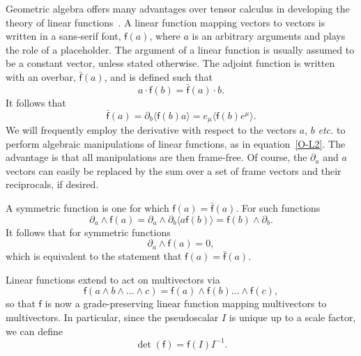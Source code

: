 \documentclass[a4paper]{article}
\numberwithin{equation}{section}
\newcommand{\dt}{\! \cdot \!}
\newcommand{\wdg}{\! \wedge \!}
\newcommand{\la}{\langle}
\newcommand{\ra}{\rangle}
\newcommand{\eqv}{=}
\newcommand{\da}{\partial_a}
\newcommand{\db}{\partial_b}
\newcommand{\lif}{\mathsf{f}}
\newcommand{\lbf}{\bar{\mathsf{f}}}
\newcommand{\fo}{\lbf}
\newcommand{\fu}{\lif}
\begin{document}
Geometric algebra offers many advantages over tensor calculus in
developing the theory of linear
functions~\cite{hes-gc,gap,hes91}.  A linear function mapping
vectors to vectors is written in a sans-serif font, $\fu(a)$, where
$a$ is an arbitrary arguments and plays the role of a placeholder.
The argument of a linear function is usually assumed to be a constant
vector, unless stated otherwise.  The adjoint function is written with
an overbar, $\fo(a)$, and is defined such that
%
\begin{equation}
a \dt \fu(b) = \fo(a) \dt b.
\end{equation}
%
It follows that
%
\begin{equation}
\fo(a) = \db \la \fu(b) a \ra = e_\mu \la \fu(b) e^\mu \ra .
\label{O-L2}
\end{equation}
%
We will frequently employ the derivative with respect to the vectors
$a$, $b$ {\em etc.} to perform algebraic manipulations of linear
functions, as in equation~\eqref{O-L2}.  The advantage is that all
manipulations are then frame-free.  Of course, the $\da$ and $a$
vectors can easily be replaced by the sum over a set of frame vectors
and their reciprocals, if desired.


A symmetric function is one for which $\fu(a)=\fo(a)$.  For such
functions 
%
\begin{equation}
\da \wdg \fu(a) = \da \wdg \db \la a \fu(b) \ra = \fu(b) \wdg \db.
\end{equation}
%
It follows that for symmetric functions
%
\begin{equation}
\da \wdg \fu(a) = 0,
\end{equation}
%
which is equivalent to the statement that $\fu(a)=\fo(a)$.  


Linear functions extend to act on multivectors via
%  
\begin{equation}  
\fu (a \wdg b \wdg \ldots \wdg c) \eqv \fu(a) \wdg \fu(b) \ldots \wdg
\fu(c),
\label{1defouter}  
\end{equation} 
%  
so that $\fu$ is now a grade-preserving linear function mapping
multivectors to multivectors.  In particular, since the pseudoscalar
$I$ is unique up to a scale factor, we can define
%
\begin{equation}
\det(\fu) = \fu(I) I^{-1}.
\end{equation}
%
\end{document}
